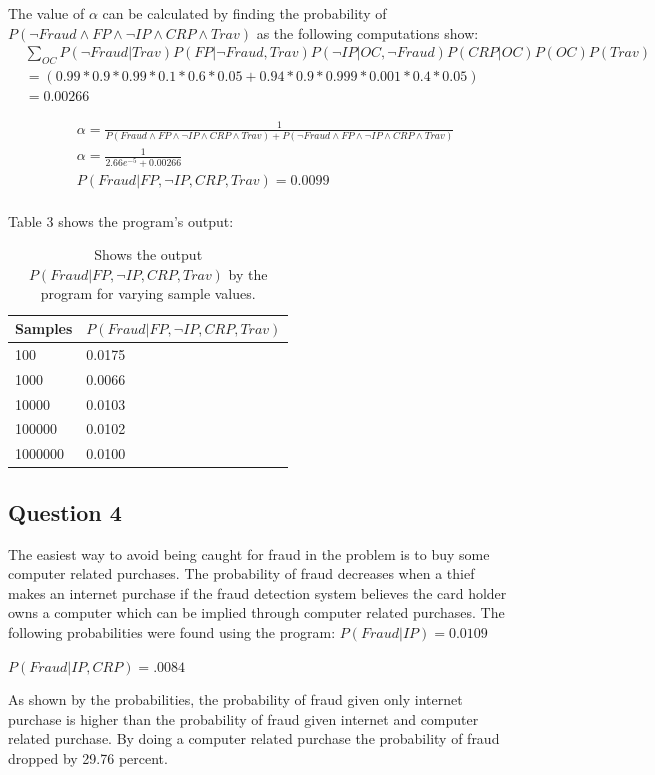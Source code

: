 \documentclass[a4paper,11pt]{report}
\begin{document}
	   The value of $\alpha$ can be calculated by finding the probability of $P(\neg Fraud \wedge FP \wedge \neg IP \wedge CRP \wedge Trav)$ as the following computations show:
	   \begin{align*}
	   &\displaystyle\sum\limits_{OC} P(\neg Fraud|Trav) P(FP|\neg Fraud, Trav) P(\neg IP|OC, \neg Fraud) P(CRP|OC) P(OC) P(Trav) \\
	   &=( 0.99*0.9*0.99*0.1*0.6*0.05 + 0.94*0.9*0.999*0.001*0.4*0.05) \\
	   &= 0.00266
	   \end{align*}
	
	
	   \begin{align*}
	    &\alpha = \frac{1}{P(Fraud \wedge FP \wedge \neg IP \wedge CRP \wedge Trav) +P(\neg Fraud \wedge FP \wedge \neg IP \wedge CRP \wedge Trav)} \\
	   &\alpha = \frac{1}{2.66e^{-5} + 0.00266} \\
	   &P(Fraud|FP, \neg IP, CRP, Trav) = 0.0099 \\
	   \end{align*}

	Table 3 shows the program's output:
			         \begin {table}[h]
			\begin{tabular*}{0.48\textwidth}[left]{|l|l|}
			\hline
			  Samples & \multicolumn{1}{|c|}{$P(Fraud|FP, \neg IP, CRP, Trav)$} \\
			  \hline
			  100 & 0.0175 \\
			  1000 & 0.0066 \\
			  10000 & 0.0103  \\
			  100000 & 0.0102 \\
			  1000000 & 0.0100 \\
			  \hline
			\end{tabular*}
			    \caption{Shows the output $P(Fraud|FP, \neg IP, CRP, Trav)$ by the program for varying sample values.}
			\end{table}

	\subsection{Question 4}
		   The easiest way to avoid being caught for fraud in the problem is to buy some computer related purchases. The probability of fraud decreases when a thief makes an internet purchase if the fraud detection system believes the card holder owns a computer which can be implied through computer related purchases. 
		   The following probabilities were found using the program:
		   $P(Fraud|IP)=0.0109$
		   
		   $P(Fraud|IP, CRP)=.0084$
		   
		   As shown by the probabilities, the probability of fraud given only internet purchase is higher than the probability of fraud given internet and computer related purchase. By doing a computer related purchase the probability of fraud dropped by 29.76 percent. 
\end{document}
